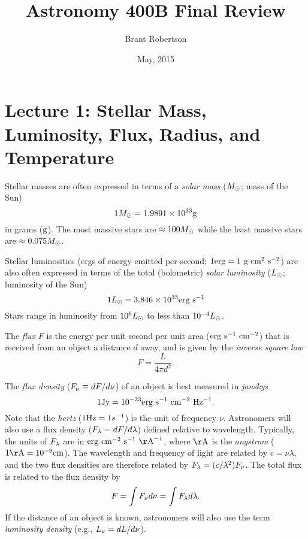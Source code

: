 \documentclass[]{article}
\title{Astronomy 400B Final Review}
\author{Brant Robertson}
\date{May, 2015}
\begin{document}
\maketitle

\section{Lecture 1: Stellar Mass, Luminosity, Flux, Radius, and Temperature}
Stellar masses are often expressed in terms of a {\it solar mass} ($M_{\odot}$; mass of the Sun)
\begin{equation}
1M_{\odot} = 1.9891\times10^{33}\mathrm{g}
\end{equation}
\noindent
in grams ($\mathrm{g}$). The most massive stars are $\approx100M_{\odot}$ while the
least massive stars are $\approx0.075M_{\odot}$.

Stellar luminosities (ergs of energy emitted per second; $1\mathrm{erg} = 1~\mathrm{g}~\mathrm{cm}^{2}~\mathrm{s}^{-2}$) are also 
often expressed in terms of the total (bolometric) {\it solar luminosity} ($L_{\odot}$; luminosity of the Sun)
\begin{equation}
1L_{\odot} = 3.846\times10^{33} \mathrm{erg}~\mathrm{s}^{-1}
\end{equation}
\noindent
Stars range in luminosity from $10^{6}L_{\odot}$ to less than $10^{-4}L_{\odot}$.

The {\it flux} $F$ is the energy per unit second per unit area ($\mathrm{erg}~\mathrm{s}^{-1}~\mathrm{cm}^{-2}$)
that is received from an object a distance $d$ away, and is
given by the {\it inverse square law}
\begin{equation}
\label{eqn:inverse_square}
F = \frac{L}{4\pi d^{2}}.
\end{equation}
\noindent

The {\it flux density} ($F_{\nu} \equiv dF/d\nu$) of an object is best measured in {\it janskys}
\begin{equation}
1\mathrm{Jy} = 10^{-23} \mathrm{erg}~\mathrm{s}^{-1}~\mathrm{cm}^{-2}~\mathrm{Hz}^{-1}.
\end{equation}
\noindent
Note that the {\it hertz} ($1\mathrm{Hz} = 1 s^{-1}$) is the unit of frequency $\nu$.
Astronomers will also use a flux density ($F_{\lambda} = dF/d\lambda$) 
defined relative to wavelength. Typically, the units of $F_{\lambda}$
are in $\erg~\cm^{-2}~\s^{-1}~\Ang^{-1}$, where $\Ang$ is the {\it angstrom}
($1\Ang = 10^{-8}\cm$). The wavelength and frequency of light are related by
$c = \nu \lambda$, and the two flux densities are therefore 
related by $F_{\lambda} = (c/\lambda^2)F_{\nu}$.
The total flux is related to the flux density by
\begin{equation}
F = \int F_{\nu} d \nu = \int F_{\lambda} d\lambda.
\end{equation}
\noindent
If the distance of an object is known, astronomers will also use the term
{\it luminosity density} (e.g., $L_{\nu} = dL/d\nu$).
\end{document}
